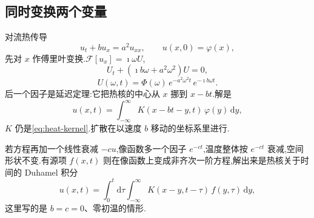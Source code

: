 \subsection{同时变换两个变量}
对流热传导
\begin{equation}
  u_t+b u_x=a^2 u_{xx},
  \qquad
  u(x,0)=\varphi(x),
\end{equation}
先对 $x$ 作傅里叶变换.$\mathcal{F}[u_x]=\imath\omega U$,
\begin{equation}
  U_t+(\imath b\omega+a^2\omega^2)U=0,
\end{equation}
\begin{equation}
  U(\omega,t)=\Phi(\omega)\,e^{-a^2\omega^2 t}\,e^{-\imath b\omega t}.
\end{equation}
后一个因子是延迟定理:它把热核的中心从 $x$ 挪到 $x-bt$.解是
\begin{equation}
  u(x,t)=\int_{-\infty}^{\infty} K(x-bt-y,t)\,\varphi(y)\,\mathrm{d}y,
\end{equation}
$K$ 仍是\eqref{eq:heat-kernel}.扩散在以速度 $b$ 移动的坐标系里进行.

若方程再加一个线性衰减 $-cu$,像函数多一个因子 $e^{-ct}$,温度整体按 $e^{-ct}$ 衰减,空间形状不变.有源项 $f(x,t)$ 则在像函数上变成非齐次一阶方程,解出来是热核关于时间的 Duhamel 积分
\begin{equation}
  u(x,t)=\int_0^t\mathrm{d}\tau\int_{-\infty}^{\infty}
  K(x-y,t-\tau)\,f(y,\tau)\,\mathrm{d}y,
\end{equation}
这里写的是 $b=c=0$、零初温的情形.

